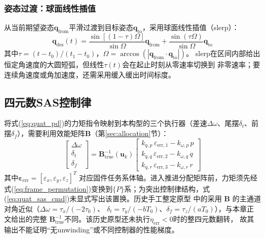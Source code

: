 \subsubsection{姿态过渡：球面线性插值}

从当前期望姿态$\mathbf{q}_{\text{from}}$平滑过渡到目标姿态$\mathbf{q}_{\text{to}}$，采用球面线性插值（slerp）\cite{shoemake1985animating}：
\begin{equation}
    \mathbf{q}_{\text{des}}(t) = \frac{\sin[(1-\tau)\Omega]}{\sin\Omega} \mathbf{q}_{\text{from}} + \frac{\sin(\tau\Omega)}{\sin\Omega} \mathbf{q}_{\text{to}}
    \label{eq:slerp}
\end{equation}
其中$\tau=(t-t_0)/(t_1-t_0)$，$\Omega=\arccos(|\mathbf q_{\text{from}}\cdot\mathbf q_{\text{to}}|)$。
slerp在区间内部给出恒定角速度的大圆短弧，但线性$\tau(t)$会在起止时刻从零速率切换到
非零速率；要连续角速度或角加速度，还需采用缓入缓出时间标度。

\subsection{四元数SAS控制律}

将式(\ref{eq:quat_pd})的力矩指令映射到本构型的三个执行器（差速$\Delta\omega$、尾摆$\delta_t$、前摆$\delta_f$），需要利用效能矩阵$\mathbf{B}$（第\ref{sec:allocation}节）：
\begin{equation}
    \begin{bmatrix} \Delta\omega \\ \delta_t \\ \delta_f \end{bmatrix}
    = \mathbf{B}_{\text{true}}^{-1}(\mathbf{u}_k)
    \begin{bmatrix}
        k_{q,p}\,\varepsilon_{\text{err},1} - k_{\omega,p}\,p \\
        k_{q,q}\,\varepsilon_{\text{err},2} - k_{\omega,q}\,q \\
        k_{q,r}\,\varepsilon_{\text{err},3} - k_{\omega,r}\,r
    \end{bmatrix}
    \label{eq:quat_sas_cmd}
\end{equation}
其中$\boldsymbol\varepsilon_{\mathrm{err}}=[\varepsilon_x,\varepsilon_y,\varepsilon_z]^T$
对应固件任务系体轴。进入推进分配矩阵前，力矩须先经
式(\ref{eq:frame_permutation})变换到$\{P\}$系；为突出控制律结构，式
(\ref{eq:quat_sas_cmd})未显式写出该置换。历史手工整定原型
中的采用
$\mathbf{B}$ 的主通道对角近似（$\Delta\omega=\tau_x/(-2\tau_0)$、
$\delta_t=\tau_y/(-bT_0)$、$\delta_f=\tau_z/(aT_0)$），与本章正文给出的完整
$\mathbf{B}_{\text{true}}^{-1}$不同。该历史原型还未执行$\eta_{\mathrm{err}}<0$时的整四元数翻转，
故其输出不能证明“无unwinding”或不同控制器的性能梯度。

